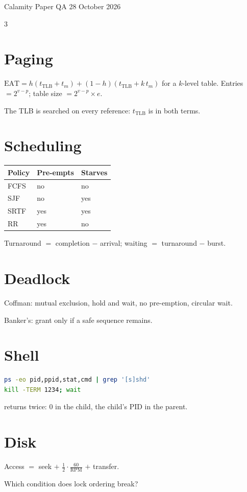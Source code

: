\documentclass[10pt]{article}
\begin{document}
\hfill{\sffamily\small\color{calMuted}Calamity Paper QA \textperiodcentered{} 28 October 2026}\par\vspace{2pt}{\color{calRule}\hrule}\vspace{4pt}
\begin{multicols*}{3}
\section{Paging}
$\mathrm{EAT} = h(t_{\mathrm{TLB}} + t_m) + (1-h)(t_{\mathrm{TLB}} + k\,t_m)$ for a $k$-level table.
Entries $= 2^{v-p}$; table size $= 2^{v-p}\times e$.
\begin{pitfall}The TLB is searched on every reference: $t_{\mathrm{TLB}}$ is in both terms.\end{pitfall}
\section{Scheduling}
\begin{tabular}{@{}lll@{}}\toprule Policy & Pre-empts & Starves\\\midrule FCFS & no & no\\ SJF & no & yes\\ SRTF & yes & yes\\ RR & yes & no\\\bottomrule\end{tabular}

Turnaround $=$ completion $-$ arrival; waiting $=$ turnaround $-$ burst.
\section{Deadlock}
Coffman: mutual exclusion, hold and wait, no pre-emption, circular wait.
\begin{keyidea}Banker's: grant only if a safe sequence remains.\end{keyidea}
\section{Shell}
\begin{lstlisting}[language=bash]
ps -eo pid,ppid,stat,cmd | grep '[s]shd'
kill -TERM 1234; wait
\end{lstlisting}
 returns twice: $0$ in the child, the child's PID in the parent.
\section{Disk}
Access $=$ seek $+$ $\frac{1}{2}\cdot\frac{60}{\mathrm{RPM}}$ $+$ transfer.
\begin{recall}\item Which condition does lock ordering break?\end{recall}
\end{multicols*}
\end{document}

